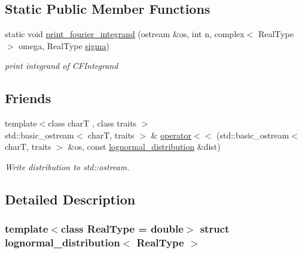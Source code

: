 \subsection*{Static Public Member Functions}
\begin{DoxyCompactItemize}
\item 
\mbox{\label{structlognormal__distribution_abaff10903e63f6b4a45a79dcf36e3ce3}} 
static void \mbox{\hyperlink{structlognormal__distribution_abaff10903e63f6b4a45a79dcf36e3ce3}{print\+\_\+fourier\+\_\+integrand}} (ostream \&os, int n, complex$<$ Real\+Type $>$ omega, Real\+Type \mbox{\hyperlink{structlognormal__distribution_a07a77c8819313d92d38a275ba1c94b55}{sigma}})
\begin{DoxyCompactList}\small\item\em print integrand of C\+F\+Integrand \end{DoxyCompactList}\end{DoxyCompactItemize}
\subsection*{Friends}
\begin{DoxyCompactItemize}
\item 
\mbox{\label{structlognormal__distribution_a67d222a97b33b757988e03549c9449bb}} 
{\footnotesize template$<$class charT , class traits $>$ }\\std\+::basic\+\_\+ostream$<$ charT, traits $>$ \& \mbox{\hyperlink{structlognormal__distribution_a67d222a97b33b757988e03549c9449bb}{operator$<$$<$}} (std\+::basic\+\_\+ostream$<$ charT, traits $>$ \&os, const \mbox{\hyperlink{structlognormal__distribution}{lognormal\+\_\+distribution}} \&dist)
\begin{DoxyCompactList}\small\item\em Write distribution to std\+::ostream. \end{DoxyCompactList}\end{DoxyCompactItemize}


\subsection{Detailed Description}
\subsubsection*{template$<$class Real\+Type = double$>$\newline
struct lognormal\+\_\+distribution$<$ Real\+Type $>$}

